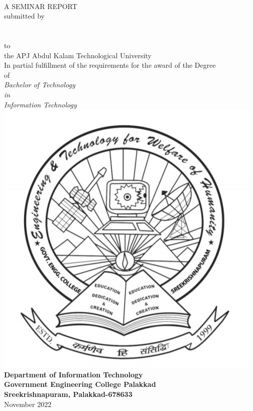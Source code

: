 \begin{titlepage}

  \begin{center}
    \textbf{\cTitle}\\
    \vfill
    A SEMINAR REPORT\\
    \vfill
    submitted by\\
    \vfill
    \textbf{
        \cName\\
        \cRegNo\\
    }
    \vfill
    to\\
    the APJ Abdul Kalam Technological University\\
    \vfill
    In partial fulfillment of the requirements for the award of the Degree\\
    of\\
    \emph{
        Bachelor of Technology\\
        in\\
        Information Technology
    }
    \vfill
    \includegraphics[scale=.3]{"covers/images/logoGecp.png"}
    \vfill
    \textbf{Department of Information Technology\\
      Government Engineering College Palakkad\\
      Sreekrishnapuram, Palakkad-678633}\\
    November 2022
  \end{center}
\end{titlepage}

